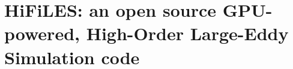 \chapter{HiFiLES: an open source GPU-powered, High-Order Large-Eddy Simulation code}


%
%
%
%
%
%
%









%

